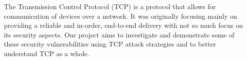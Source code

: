 The Transmission Control Protocol (TCP) is a protocol that allows for communication of devices over a network. It was originally focusing mainly on providing a reliable and in-order, end-to-end delivery with not so much focus on its security aspects. Our project aims to investigate and demonstrate some of these security vulnerabilities using TCP attack strategies and to better understand TCP as a whole. 
